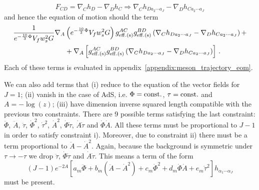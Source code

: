 \documentclass[a4paper,12pt]{article}
\begin{document}
\begin{equation}
F_{CD} = \nabla_C h_D - \nabla_D h_C \Rightarrow \nabla_C h_{D a_2 \cdots a_J} - \nabla_D h_{C a_2 \cdots a_J}
\label{eq:spin_j_sub}
\end{equation}
and  hence the equation of motion should the term
\begin{align}
\frac{1}{e^{-\frac{10}{3} \Phi} V_f w_s^2 G}\nabla_A & \left(e^{-\frac{10}{3} \Phi} V_f w_s^2 G \right)g^{AC}_{\rm{eff. (s)}}g^{BD}_{\rm{eff. (s)}}\left(\nabla_C h_{D a_2 \cdots a_J} - \nabla_D h_{C a_2 \cdots a_J}\right) + \label{eq:spin_J_eom_cov_term} \\
&+\nabla_A \left[g^{AC}_{\rm{eff. (s)}}g^{BD}_{\rm{eff. (s)}}\left(\nabla_C h_{D a_2 \cdots a_J} - \nabla_D h_{C a_2 \cdots a_J}\right)\right]  \, . \notag
\end{align}
Each of these terms is evaluated in appendix~\ref{appendix:meson_trajectory_eom}.

We can also add terms that (i) reduce to the equation of the vector fields for $J = 1$; (ii) vanish in the case of AdS, i.e. $\Phi = \rm{const.}$, $\tau = \rm{const.}$ and $A =  - \log(z)$; (iii) have dimension inverse squared length compatible with the previous two constraints. There are 9 possible terms satisfying the last constraint: $\ddot{\Phi}$, $\ddot{A}$, $\ddot{\tau}$, ${\dot{\Phi}}^2$, ${\dot{\tau}}^2$, ${\dot{A}}^2$, $\dot{\Phi} \dot{\tau}$, $\dot{A}\dot{\tau}$ and $\dot{\Phi}\dot{A}$. All these terms must be proportional to $J-1$ in order to satisfy constraint i). Moreover, due to constraint ii) there must be a term proportional to $\ddot{A} - \dot{A}^2$. Again, because the background is symmetric under $\tau \rightarrow -\tau$ we drop $\ddot{\tau}$, $\dot{\Phi}\dot{\tau}$ and $\dot{A}\dot{\tau}$. This means a term of the form
\begin{equation}
\left(J-1\right) e^{-2A} \left[ a_m \ddot{\Phi} + b_m \left(\ddot{A} - {\dot{A}}^2\right) + c_m {\dot{\Phi}}^2 + d_m \dot{\Phi} \dot{A}  + e_m {\dot{\tau}}^2\right] h_{\alpha_1 \cdots \alpha_J}
\end{equation}
must be present.
\end{document}
